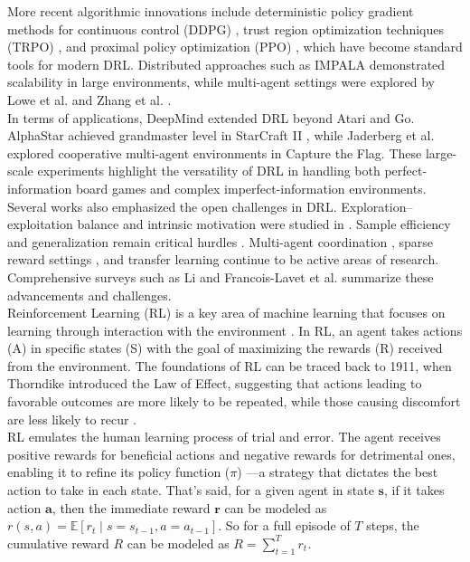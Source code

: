 More recent algorithmic innovations include deterministic policy gradient 
methods for continuous control (DDPG) \cite{lillicrap2015}, trust region 
optimization techniques (TRPO) \cite{schulman2015}, and proximal policy 
optimization (PPO) \cite{schulman2017}, which have become standard tools 
for modern DRL. Distributed approaches such as IMPALA \cite{espeholt2018} 
demonstrated scalability in large environments, while multi-agent settings 
were explored by Lowe et al. \cite{lowe2017} and Zhang et al. \cite{AD2}. \\

In terms of applications, DeepMind extended DRL beyond Atari and Go. 
AlphaStar achieved grandmaster level in StarCraft II \cite{vinyals2019}, 
while Jaderberg et al. \cite{jaderberg2019} explored cooperative multi-agent 
environments in Capture the Flag. These large-scale experiments highlight 
the versatility of DRL in handling both perfect-information board games and 
complex imperfect-information environments. \\

Several works also emphasized the open challenges in DRL. Exploration–
exploitation balance and intrinsic motivation were studied in 
\cite{bellemare2016}\cite{pathak2017}. Sample efficiency and generalization 
remain critical hurdles \cite{zhang2018generalization}\cite{kirk2023}. Multi-agent 
coordination \cite{zhang2019multi}, sparse reward settings \cite{ecoffet2021}, 
and transfer learning \cite{taylor2009} continue to be active areas of research. 
Comprehensive surveys such as Li \cite{li2018survey} and Francois-Lavet et al. 
\cite{francois2018} summarize these advancements and challenges. \\

Reinforcement Learning (RL) is a key area of machine learning that focuses on
learning through interaction with the environment  \cite{bg2}. In RL, an agent takes
actions (A) in specific states (S) with the goal of maximizing the rewards (R)
received from the environment. The foundations of RL can be traced back to
1911, when Thorndike introduced the Law of Effect, suggesting that actions
leading to favorable outcomes are more likely to be repeated, while those
causing discomfort are less likely to recur \cite{bg1}.\\ RL emulates the human
learning process of trial and error. The agent receives positive rewards for
beneficial actions and negative rewards for detrimental ones, enabling it to
refine its policy function ($\pi$) —a strategy that dictates the best action to take in
each state. That's said, for a given agent in state $\textbf{s}$, if it takes action $\textbf{a}$,
then the immediate reward $\textbf{r}$ can be modeled as $r(s, a) = \mathbb{E}[r_t \mid
    s=s_{t-1}, a=a_{t-1}]$. So for a full episode of $T$ steps, the cumulative
reward \textbf{$R$} can be modeled as $R = \sum_{t=1}^{T} r_t$.\\

